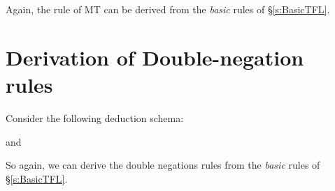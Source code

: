 \begin{pf}
		\open
		\close
\end{pf}
Again, the rule of MT can be derived from the \emph{basic} rules of \S\ref{s:BasicTFL}.



\section{Derivation of Double-negation rules}
Consider the following deduction schema:

\begin{pf}
	\open
	\close
{}
\end{pf}
and

\begin{pf}
	\open
	\close
{}
\end{pf}
So again,  we can derive the double negations rules from the \emph{basic} rules of \S\ref{s:BasicTFL}.




%
%
%
%


